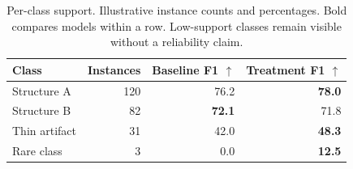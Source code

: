 \begin{table}[!htbp]
\centering\small
\begin{tabular}{lrrr}
\toprule
Class & Instances & Baseline F1 $\uparrow$ & Treatment F1 $\uparrow$ \\
\midrule
Structure A & 120 & 76.2 & \textbf{78.0} \\
Structure B & 82 & \textbf{72.1} & 71.8 \\
Thin artifact & 31 & 42.0 & \textbf{48.3} \\
Rare class & 3 & 0.0 & \textbf{12.5} \\
\bottomrule
\end{tabular}
\caption{Per-class support. Illustrative instance counts and percentages. Bold compares models within a row. Low-support classes remain visible without a reliability claim.}
\label{tab:per-class-support}
\end{table}
